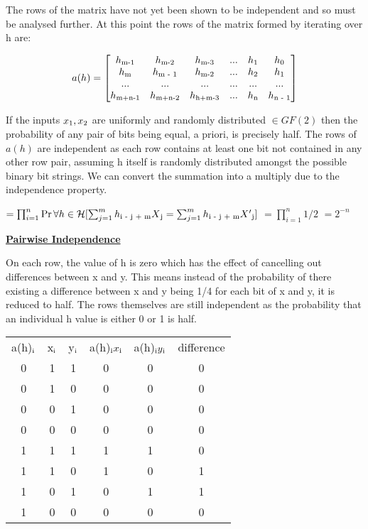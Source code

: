 \documentclass[11pt]{article}
\begin{document}
\begin{flushleft}
The rows of the matrix have not yet been shown to be independent and so must be analysed further. At this point the rows of the matrix formed by iterating over h are:

\[
a(h)=
  \begin{bmatrix}
  h\textsubscript{m-1} & h\textsubscript{m-2} & h\textsubscript{m-3} & ... & h\textsubscript{1} & h\textsubscript{0} \\
  h\textsubscript{m} & h\textsubscript{m - 1} & h\textsubscript{m-2} & ... & h\textsubscript{2} & h\textsubscript{1} \\
  ... & ... & ... & ... & ... & ... \\
  h\textsubscript{m+n-1} & h\textsubscript{m+n-2} & h\textsubscript{h+m-3} & ... & h\textsubscript{n} & h\textsubscript{n - 1}
  \end{bmatrix}
\]

If the inputs $x\textsubscript{1}, x\textsubscript{2}$ are uniformly and randomly distributed $\in GF(2)$ then the probability of any pair of bits being equal, a priori, is precisely half. The rows of $a(h)$ are independent as each row contains at least one bit not contained in any other row pair, assuming h itself is randomly distributed amongst the possible binary bit strings. We can convert the summation into a multiply due to the independence property.

$ = \prod_{i=1}^{n} \Pr\forall h \in \mathcal{H} [\sum_{j=1}^{m} h\textsubscript{i - j + m}X\textsubscript{j} = \sum_{j=1}^{m} h\textsubscript{i - j + m}X'\textsubscript{j}]$
$ = \prod_{i=1}^{n} 1 / 2$
$ = 2 ^{-n} $

\textbf{\underline{Pairwise Independence}}

On each row, the value of h is zero which has the effect of cancelling out differences between x and y. This means instead of the probability of there existing a difference between x and y being 1/4 for each bit of x and y, it is reduced to half. The rows themselves are still independent as the probability that an individual h value is either 0 or 1 is half.

\begin{center}
\begin{tabular}{ |c|c|c|c|c|c| } 
 \hline
 a(h)$\textsubscript{i}$ & x$\textsubscript{i}$ & y$\textsubscript{i}$ & a(h)$\textsubscript{i}x\textsubscript{i}$ & a(h)$\textsubscript{i}y\textsubscript{i}$ & difference \\ 
 0 & 1 & 1 & 0 & 0 & 0   \\ 
 0 & 1 & 0 & 0 & 0 & 0   \\ 
 0 & 0 & 1 & 0 & 0 & 0   \\ 
 0 & 0 & 0 & 0 & 0 & 0   \\ 
 1 & 1 & 1 & 1 & 1 & 0   \\ 
 1 & 1 & 0 & 1 & 0 & 1   \\ 
 1 & 0 & 1 & 0 & 1 & 1   \\ 
 1 & 0 & 0 & 0 & 0 & 0   \\ 
 \hline
\end{tabular}
\end{center}


\end{flushleft}
\end{document}
